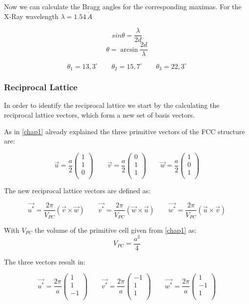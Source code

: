 Now we can calculate the Bragg angles for the corresponding maximas.
For the X-Ray wavelength $\lambda = 1.54 \, \mathring{A}$

$$
sin \theta = \frac{\lambda}{2d}
$$
$$
\theta = \arcsin{\frac{2d}{\lambda}}
$$

$$
\theta_1 = 13,3^\circ \qquad \theta_2 = 15,7^\circ \qquad \theta_3 = 22,3^\circ
$$


\subsubsection*{Reciprocal Lattice}
In order to identify the reciprocal lattice we start by the calculating
the reciprocal lattice vectors, which form a new set of basis vectors.

As in \autoref{chap1} already explained the three primitive vectors
of the FCC structure are:

$$\vec{u} = \frac{a}{2} \left(\begin{matrix}1\\1\\0\\\end{matrix}\right) \qquad
\vec{v} = \frac{a}{2} \left(\begin{matrix}0\\1\\1\\\end{matrix}\right) \qquad
\vec{w} = \frac{a}{2} \left(\begin{matrix}1\\0\\1\\\end{matrix}\right)$$

The new reciprocal lattice vectors are defined as:

\begin{equation}
    \vec{u^*} = \frac{2 \pi}{V_{PC}} (\vec{v} \times \vec{w}) \qquad
    \vec{v^*} = \frac{2 \pi}{V_{PC}} (\vec{w} \times \vec{u}) \qquad
    \vec{w^*} = \frac{2 \pi}{V_{PC}} (\vec{u} \times \vec{v})
\end{equation}

With $V_{PC}$ the volume of the primitive cell given from \autoref{chap1}
as:
$$V_{PC} = \frac{a^3}{4}$$

The three vectors result in:

$$
    \vec{u^*} = \frac{2\pi}{a} \left(\begin{matrix}1\\1\\-1\\\end{matrix}\right) \qquad
    \vec{v^*} = \frac{2\pi}{a} \left(\begin{matrix}-1\\1\\1\\\end{matrix}\right) \qquad
    \vec{w^*} = \frac{2\pi}{a} \left(\begin{matrix}1\\-1\\1\\\end{matrix}\right)
$$

